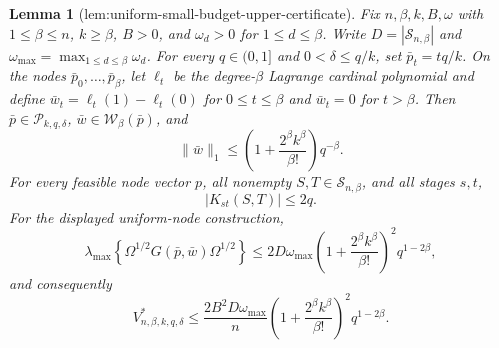\documentclass{article}
\newtheorem{lemma}{Lemma}
\begin{document}
\begin{lemma}[lem:uniform-small-budget-upper-certificate]\label{lem:uniform-small-budget-upper-certificate}
Fix \(n,\beta,k,B,\omega\) with \(1\le\beta\le n\), \(k\ge\beta\), \(B>0\), and \(\omega_d>0\) for \(1\le d\le\beta\).  Write \(D=|\mathcal S_{n,\beta}|\) and \(\omega_{\max}=\max_{1\le d\le\beta}\omega_d\).  For every \(q\in(0,1]\) and \(0<\delta\le q/k\), set \(\bar p_t=tq/k\).  On the nodes \(\bar p_0,\ldots,\bar p_\beta\), let \(\ell_t\) be the degree-\(\beta\) Lagrange cardinal polynomial and define \(\bar w_t=\ell_t(1)-\ell_t(0)\) for \(0\le t\le\beta\) and \(\bar w_t=0\) for \(t>\beta\).  Then \(\bar p\in\mathcal P_{k,q,\delta}\), \(\bar w\in\mathcal W_\beta(\bar p)\), and
\[
\|\bar w\|_1\le
\left(1+\frac{2^\beta k^\beta}{\beta!}\right)q^{-\beta}.
\]
For every feasible node vector \(p\), all nonempty \(S,T\in\mathcal S_{n,\beta}\), and all stages \(s,t\),
\[
|K_{st}(S,T)|\le2q.
\]
For the displayed uniform-node construction,
\[
\lambda_{\max}\!\left\{\Omega^{1/2}G(\bar p,\bar w)\Omega^{1/2}\right\}
\le 2D\omega_{\max}
\left(1+\frac{2^\beta k^\beta}{\beta!}\right)^2q^{1-2\beta},
\]
and consequently
\[
V^*_{n,\beta,k,q,\delta}
\le\frac{2B^2D\omega_{\max}}{n}
\left(1+\frac{2^\beta k^\beta}{\beta!}\right)^2q^{1-2\beta}.
\]
\end{lemma}
\end{document}
